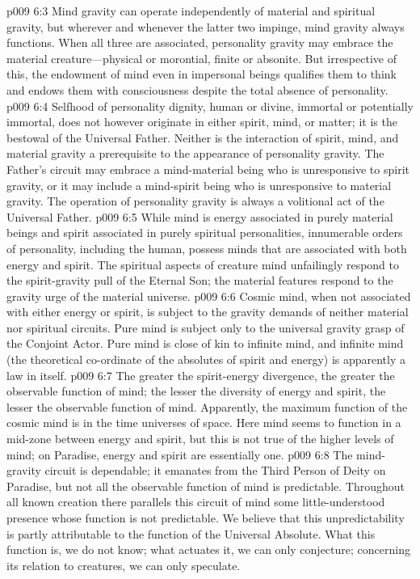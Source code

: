 \pc \vs p009 6:3 Mind gravity can operate independently of material and spiritual gravity, but wherever and whenever the latter two impinge, mind gravity always functions. When all three are associated, personality gravity may embrace the material creature---physical or morontial, finite or absonite. But irrespective of this, the endowment of mind even in impersonal beings qualifies them to think and endows them with consciousness despite the total absence of personality.
\pc \vs p009 6:4 Selfhood of personality dignity, human or divine, immortal or potentially immortal, does not however originate in either spirit, mind, or matter; it is the bestowal of the Universal Father. Neither is the interaction of spirit, mind, and material gravity a prerequisite to the appearance of personality gravity. The Father’s circuit may embrace a mind\hyp{}material being who is unresponsive to spirit gravity, or it may include a mind\hyp{}spirit being who is unresponsive to material gravity. The operation of personality gravity is always a volitional act of the Universal Father.
\vs p009 6:5 While mind is energy associated in purely material beings and spirit associated in purely spiritual personalities, innumerable orders of personality, including the human, possess minds that are associated with both energy and spirit. The spiritual aspects of creature mind unfailingly respond to the spirit\hyp{}gravity pull of the Eternal Son; the material features respond to the gravity urge of the material universe.
\pc \vs p009 6:6 Cosmic mind, when not associated with either energy or spirit, is subject to the gravity demands of neither material nor spiritual circuits. Pure mind is subject only to the universal gravity grasp of the Conjoint Actor. Pure mind is close of kin to infinite mind, and infinite mind (the theoretical co\hyp{}ordinate of the absolutes of spirit and energy) is apparently a law in itself.
\vs p009 6:7 The greater the spirit\hyp{}energy divergence, the greater the observable function of mind; the lesser the diversity of energy and spirit, the lesser the observable function of mind. Apparently, the maximum function of the cosmic mind is in the time universes of space. Here mind seems to function in a mid\hyp{}zone between energy and spirit, but this is not true of the higher levels of mind; on Paradise, energy and spirit are essentially one.
\pc \vs p009 6:8 The mind\hyp{}gravity circuit is dependable; it emanates from the Third Person of Deity on Paradise, but not all the observable function of mind is predictable. Throughout all known creation there parallels this circuit of mind some little\hyp{}understood presence whose function is not predictable. We believe that this unpredictability is partly attributable to the function of the Universal Absolute. What this function is, we do not know; what actuates it, we can only conjecture; concerning its relation to creatures, we can only speculate.\plusone
